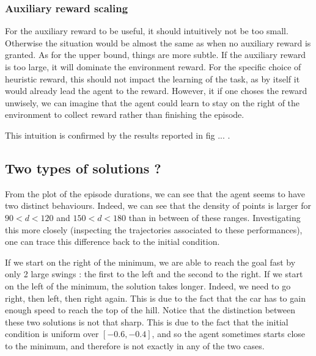 \documentclass[a4paper, 12pt,oneside]{article}
\begin{document}
        \subsubsection{Auxiliary reward scaling}
        For the auxiliary reward to be useful, it should intuitively not be too small. Otherwise the situation would be almost the same as when no auxiliary reward is granted. As for the upper bound, things are more subtle. If the auxiliary reward is too large, it will dominate the environment reward. For the specific choice of heuristic reward, this should not impact the learning of the task, as by itself it would already lead the agent to the reward. However, it if one choses the reward unwisely, we can imagine that the agent could learn to stay on the right of the environment to collect reward rather than finishing the episode.

        This intuition is confirmed by the results reported in fig ... . 
        \subsection{Two types of solutions ?}
        From the plot of the episode durations, we can see that the agent seems to have two distinct behaviours. Indeed, we can see that the density of points is larger for $90<d<120$ and $150<d<180$ than in between of these ranges. Investigating this more closely (inspecting the trajectories associated to these performances), one can trace this difference back to the initial condition. 
        
        If we start on the right of the minimum, we are able to reach the goal fast by only 2 large swings : the first to the left and the second to the right. If we start on the left of the minimum, the solution takes longer. Indeed, we need to go right, then left, then right again. This is due to the fact that the car has to gain enough speed to reach the top of the hill.
        Notice that the distinction between these two solutions is not that sharp. This is due to the fact that the initial condition is uniform over $[-0.6,-0.4]$, and so the agent sometimes starts close to the minimum, and therefore is not exactly in any of the two cases. 
\end{document}
